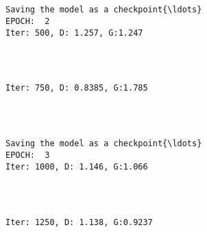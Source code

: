 \documentclass[11pt]{article}
\begin{document}
    \begin{center}
    \end{center}
    { \hspace*{\fill} \\}
    
    \begin{Verbatim}[commandchars=\\\{\}]

Saving the model as a checkpoint{\ldots}
EPOCH:  2
Iter: 500, D: 1.257, G:1.247
    \end{Verbatim}

    \begin{center}
    \end{center}
    { \hspace*{\fill} \\}
    
    \begin{Verbatim}[commandchars=\\\{\}]

Iter: 750, D: 0.8385, G:1.785
    \end{Verbatim}

    \begin{center}
    \end{center}
    { \hspace*{\fill} \\}
    
    \begin{Verbatim}[commandchars=\\\{\}]

Saving the model as a checkpoint{\ldots}
EPOCH:  3
Iter: 1000, D: 1.146, G:1.066
    \end{Verbatim}

    \begin{center}
    \end{center}
    { \hspace*{\fill} \\}
    
    \begin{Verbatim}[commandchars=\\\{\}]

Iter: 1250, D: 1.138, G:0.9237
    \end{Verbatim}
\end{document}
